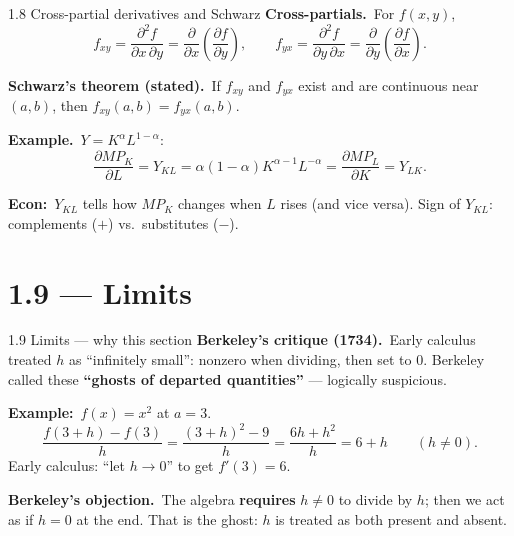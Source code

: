 \documentclass[11pt,aspectratio=169]{beamer}
\begin{document}
\begin{frame}{1.8 Cross-partial derivatives and Schwarz}
  \footnotesize
  \textbf{Cross-partials.}\ For $f(x,y)$,
  \[
    f_{xy}=\frac{\partial^2 f}{\partial x\,\partial y}
    =\frac{\partial}{\partial x}\!\left(\frac{\partial f}{\partial y}\right),
    \qquad
    f_{yx}=\frac{\partial^2 f}{\partial y\,\partial x}
    =\frac{\partial}{\partial y}\!\left(\frac{\partial f}{\partial x}\right).
  \]

  \medskip
  \textbf{Schwarz's theorem (stated).}\ If $f_{xy}$ and $f_{yx}$ exist and are
  continuous near $(a,b)$, then $f_{xy}(a,b)=f_{yx}(a,b)$.

  \medskip
  \textbf{Example.}\ $Y=K^{\alpha}L^{1-\alpha}$:
  \[
    \frac{\partial MP_K}{\partial L}
    =Y_{KL}=\alpha(1-\alpha)K^{\alpha-1}L^{-\alpha}
    =\frac{\partial MP_L}{\partial K}=Y_{LK}.
  \]

  \medskip
  {\scriptsize \textbf{Econ:}\ $Y_{KL}$ tells how $MP_K$ changes when $L$ rises
  (and vice versa). Sign of $Y_{KL}$: complements ($+$) vs.\ substitutes ($-$).}
\end{frame}

\section{1.9 --- Limits}

\begin{frame}{1.9 Limits --- why this section}
  \footnotesize
  \textbf{Berkeley's critique (1734).}\ Early calculus treated $h$ as
  ``infinitely small'': nonzero when dividing, then set to $0$.
  Berkeley called these \textbf{``ghosts of departed quantities''} --- logically
  suspicious.

  \medskip
  \textbf{Example:}\ $f(x)=x^2$ at $a=3$.
  \[
    \frac{f(3+h)-f(3)}{h}
    =\frac{(3+h)^2-9}{h}
    =\frac{6h+h^2}{h}
    =6+h\qquad(h\neq 0).
  \]
  Early calculus: ``let $h\to 0$'' to get $f'(3)=6$.

  \medskip
  \textbf{Berkeley's objection.}\ The algebra \textbf{requires} $h\neq 0$ to divide by
  $h$; then we act as if $h=0$ at the end.
  That is the ghost: $h$ is treated as both present and absent.
\end{frame}
\end{document}
